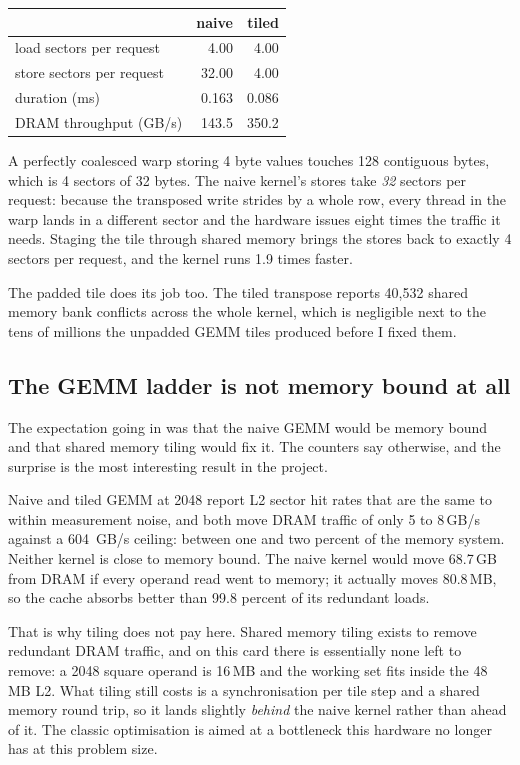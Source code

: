 \begin{center}
\begin{tabular}{lrr}
\toprule
 & naive & tiled \\
\midrule
load sectors per request & 4.00 & 4.00 \\
store sectors per request & 32.00 & 4.00 \\
duration (ms) & 0.163 & 0.086 \\
DRAM throughput (GB/s) & 143.5 & 350.2 \\
\bottomrule
\end{tabular}
\end{center}

A perfectly coalesced warp storing 4 byte values touches 128 contiguous bytes,
which is 4 sectors of 32 bytes. The naive kernel's stores take \emph{32} sectors
per request: because the transposed write strides by a whole row, every thread in
the warp lands in a different sector and the hardware issues eight times the
traffic it needs. Staging the tile through shared memory brings the stores back
to exactly 4 sectors per request, and the kernel runs 1.9 times faster.

The padded tile does its job too. The tiled transpose reports 40{,}532 shared
memory bank conflicts across the whole kernel, which is negligible next to the
tens of millions the unpadded GEMM tiles produced before I fixed them.

\subsection{The GEMM ladder is not memory bound at all}

The expectation going in was that the naive GEMM would be memory bound and that
shared memory tiling would fix it. The counters say otherwise, and the surprise
is the most interesting result in the project.

Naive and tiled GEMM at 2048 report L2 sector hit rates that are the same to
within measurement noise, and both move DRAM traffic of only 5 to 8\,GB/s against
a \SI{604}{GB/s} ceiling: between one and two percent of the memory system.
Neither kernel is close to memory bound. The naive kernel would move 68.7\,GB
from DRAM if every operand read went to memory; it actually moves 80.8\,MB, so
the cache absorbs better than 99.8 percent of its redundant loads.

That is why tiling does not pay here. Shared memory tiling exists to remove
redundant DRAM traffic, and on this card there is essentially none left to
remove: a 2048 square operand is 16\,MB and the working set fits inside the
48\,MB L2. What tiling still costs is a synchronisation per tile step and a
shared memory round trip, so it lands slightly \emph{behind} the naive kernel
rather than ahead of it. The classic optimisation is aimed at a bottleneck this
hardware no longer has at this problem size.

